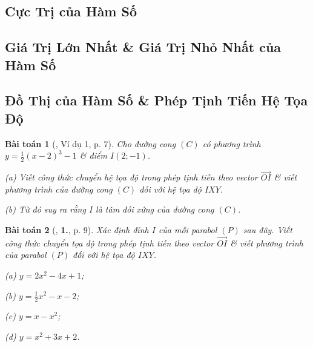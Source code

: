 \documentclass[12pt]{article}
\numberwithin{equation}{section}
\newtheorem{baitoan}{Bài toán}[section]
\begin{document}
\subsection{Cực Trị của Hàm Số}


\subsection{Giá Trị Lớn Nhất \& Giá Trị Nhỏ Nhất của Hàm Số}


\subsection{Đồ Thị của Hàm Số \& Phép Tịnh Tiến Hệ Tọa Độ}

\begin{baitoan}[\cite{TL_chuyen_Toan_Giai_Tich_12}, Ví dụ 1, p. 7]
	Cho đường cong $(C)$ có phương trình $y = \frac{1}{2}(x - 2)^3 - 1$ \& điểm $I(2;-1)$.
	\begin{enumerate*}
		\item[(a)] Viết công thức chuyển hệ tọa độ trong phép tịnh tiến theo vector $\overrightarrow{OI}$ \& viết phương trình của đường cong $(C)$ đối với hệ tọa độ $IXY$.
		\item[(b)] Từ đó suy ra rằng $I$ là tâm đối xứng của đường cong $(C)$.
	\end{enumerate*}
\end{baitoan}

\begin{baitoan}[\cite{TL_chuyen_Toan_Giai_Tich_12}, \textbf{1.}, p. 9]
	Xác định đỉnh $I$ của mỗi parabol $(P)$ sau đây. Viết công thức chuyển tọa độ trong phép tịnh tiến theo vector $\overrightarrow{OI}$ \& viết phương trình của parabol $(P)$ đối với hệ tọa độ $IXY$.
	\begin{enumerate*}
		\item[(a)] $y = 2x^2 - 4x + 1$;
		\item[(b)] $y = \frac{1}{2}x^2 - x - 2$;
		\item[(c)] $y = x - x^2$;
		\item[(d)] $y = x^2 + 3x + 2$.
	\end{enumerate*}
\end{baitoan}
\end{document}
